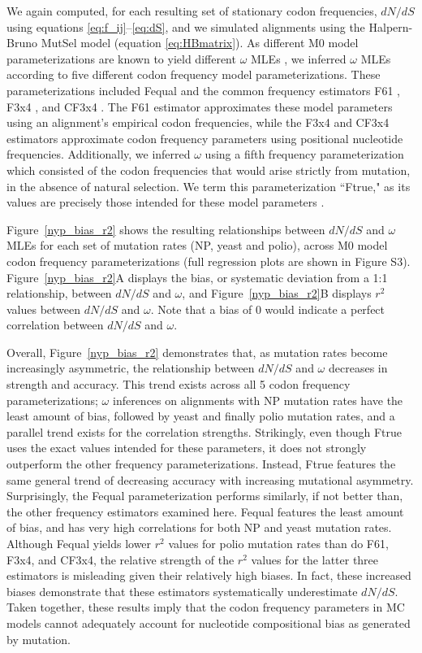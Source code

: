 \documentclass{pnastwo}
\begin{document}
\begin{article}
We again computed, for each resulting set of stationary codon frequencies, $dN/dS$ using equations \eqref{eq:f_ij}--\eqref{eq:dS}, and we simulated alignments using the Halpern-Bruno MutSel model (equation \eqref{eq:HBmatrix}). As different M0 model parameterizations are known to yield different $\omega$ MLEs \cite{Yang2006,ZhangYu2006,Pond2010}, we inferred $\omega$ MLEs according to five different codon frequency model parameterizations. These parameterizations included Fequal \cite{Yang2006} and the common frequency estimators F61 \cite{GoldmanYang1994}, F3x4 \cite{MuseGaut1994}, and CF3x4 \cite{Pond2010}. The F61 estimator approximates these model parameters using an alignment's empirical codon frequencies, while the F3x4 and CF3x4 estimators approximate codon frequency parameters using positional nucleotide frequencies. Additionally, we inferred $\omega$ using a fifth frequency parameterization which consisted of the codon frequencies that would arise strictly from mutation, in the absence of natural selection. We term this parameterization ``Ftrue," as its values are precisely those intended for these model parameters \cite{GoldmanYang1994,MuseGaut1994,YN00,Yang2006}.
		
		
Figure~\ref{nyp_bias_r2} shows the resulting relationships between $dN/dS$ and $\omega$ MLEs for each set of mutation rates (NP, yeast and polio), across M0 model codon frequency parameterizations (full regression plots are shown in Figure S3). Figure~\ref{nyp_bias_r2}A displays the bias, or systematic deviation from a 1:1 relationship, between $dN/dS$ and $\omega$, and Figure~\ref{nyp_bias_r2}B displays $r^2$ values between $dN/dS$ and $\omega$. Note that a bias of 0 would indicate a perfect correlation between $dN/dS$ and $\omega$. 
		
Overall, Figure~\ref{nyp_bias_r2} demonstrates that, as mutation rates become increasingly asymmetric, the relationship between $dN/dS$ and $\omega$ decreases in strength and accuracy. This trend exists across all 5 codon frequency parameterizations; $\omega$ inferences on alignments with NP mutation rates have the least amount of bias, followed by yeast and finally polio mutation rates, and a parallel trend exists for the correlation strengths. Strikingly, even though Ftrue uses the exact values intended for these parameters, it does not strongly outperform the other frequency parameterizations. Instead, Ftrue features the same general trend of decreasing accuracy with increasing mutational asymmetry. Surprisingly, the Fequal parameterization performs similarly, if not better than, the other frequency estimators examined here. Fequal features the least amount of bias, and has very high correlations for both NP and yeast mutation rates. Although Fequal yields lower $r^2$ values for polio mutation rates than do F61, F3x4, and CF3x4, the relative strength of the $r^2$ values for the latter three estimators is misleading given their relatively high biases. In fact, these increased biases demonstrate that these estimators systematically underestimate $dN/dS$. Taken together, these results imply that the codon frequency parameters in MC models cannot adequately account for nucleotide compositional bias as generated by mutation. 
		

\end{article}
\end{document}
